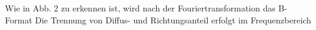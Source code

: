 

Wie in Abb. 2 zu erkennen ist, wird nach der Fouriertransformation das B-Format 
Die Trennung von Diffus- und Richtungsanteil erfolgt im Frequenzbereich 